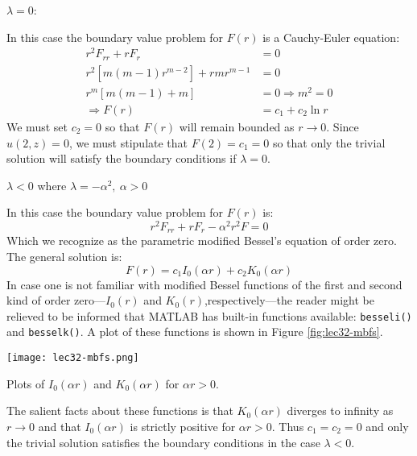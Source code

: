 \vspace{0.25cm}

\noindent\underline{$\lambda = 0$}:

\vspace{0.25cm}

\noindent In this case the boundary value problem for $F(r)$ is a Cauchy-Euler equation:
\begin{align*}
r^2F_{rr} + rF_r &= 0 \\
r^2[m(m-1)r^{m-2}] + rmr^{m-1} &= 0 \\
r^m[m(m-1) + m] &= 0 \Rightarrow m^2 = 0\\
\Rightarrow F(r) &= c_1 + c_2 \ln r
\end{align*}
We must set $c_2=0$ so that $F(r)$ will remain bounded as $r \to 0$.  Since $u(2,z)=0$, we must stipulate that $F(2)=c_1=0$ so that only the trivial solution will satisfy the boundary conditions if $\lambda = 0$.

\vspace{0.25cm}

\noindent\underline{$\lambda < 0$} where $\lambda = -\alpha^2, \ \alpha>0$

\noindent In this case the boundary value problem for $F(r)$ is:
\begin{equation*}
r^2F_{rr} + rF_r -\alpha^2r^2F = 0
\end{equation*} 
Which we recognize as the parametric modified Bessel's equation of order zero.  The general solution is:
\begin{equation*}
F(r) = c_1I_0(\alpha r) + c_2 K_0(\alpha r)
\end{equation*}
In case one is not familiar with modified Bessel functions of the first and second kind of order zero---$I_0(r)$ and $K_0(r)$,respectively---the reader might be relieved to be informed that MATLAB has built-in functions available: \lstinline[style=myMatlab]{besseli()} and \lstinline[style=myMatlab]{besselk()}. A plot of these functions is shown in Figure \ref{fig:lec32-mbfs}.
\begin{marginfigure}
\texttt{[image: lec32-mbfs.png]}
\caption{Plots of $I_0(\alpha r)$ and $K_0(\alpha r)$ for $\alpha r > 0$.}
\label{fig:lec32-mbfs}
\end{marginfigure}
The salient facts about these functions is that $K_0(\alpha r)$ diverges to infinity as $r \to 0$ and that $I_0(\alpha r)$ is strictly positive for $\alpha r > 0$.  Thus $c_1 = c_2 = 0$ and only the trivial solution satisfies the boundary conditions in the case $\lambda < 0 $.

